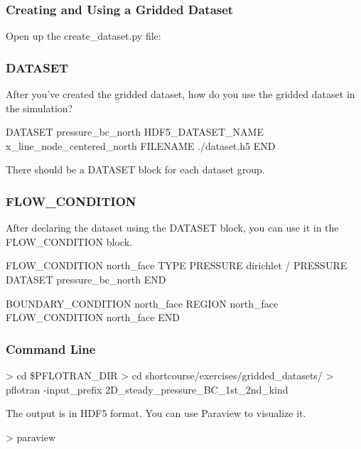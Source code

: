 \documentclass{beamer}
\begin{document}
\begin{frame}\frametitle{Creating and Using a Gridded Dataset}

Open up the create\_dataset.py file:

\end{frame}

\begin{frame}\frametitle{DATASET}

After you've created the gridded dataset,
how do you use the gridded dataset in the simulation? 

\begin{semiverbatim}
DATASET pressure_bc_north
  HDF5_DATASET_NAME x_line_node_centered_north
  FILENAME ./dataset.h5
END
\end{semiverbatim}

There should be a DATASET block for each dataset group.

\end{frame}

\begin{frame}\frametitle{FLOW\_CONDITION}

After declaring the dataset using the DATASET block, you can use it in
the FLOW\_CONDITION block.

\begin{semiverbatim}
FLOW_CONDITION north_face
  TYPE
    PRESSURE dirichlet
  /
  PRESSURE DATASET pressure_bc_north
END

BOUNDARY_CONDITION north_face
  REGION north_face
  FLOW_CONDITION north_face
END
\end{semiverbatim}

\end{frame}

\begin{frame}[fragile]\frametitle{Command Line}

\begin{semiverbatim}

 > cd \$PFLOTRAN_DIR
 > cd shortcourse/exercises/gridded_datasets/
 > pflotran -input_prefix 2D_steady_pressure_BC_1st_2nd_kind

\end{semiverbatim}

The output is in HDF5 format. You can use Paraview to visualize it.

\begin{semiverbatim}
> paraview
\end{semiverbatim}

\end{frame}
\end{document}
